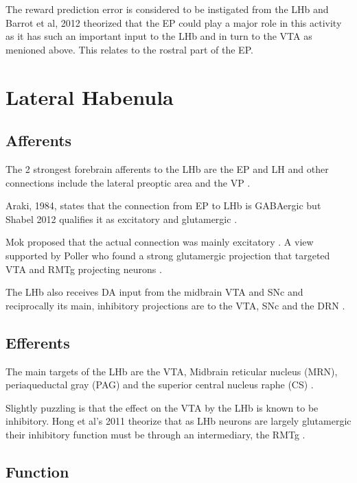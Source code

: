 \documentclass[12pt,a4paper]{article}
\let\oldsection\section
\renewcommand\section{\clearpage\oldsection}
\begin{document}
The reward prediction error is considered to be instigated from the LHb and Barrot et al, 2012 theorized that the EP could play a major role in this activity as it has such an important input to the LHb \citep{Barrot2012} and in turn to the VTA as menioned above. This relates to the rostral part of the EP.







\section{Lateral Habenula}

\subsection{Afferents}

The 2 strongest forebrain afferents to the LHb are the EP and LH and other connections include the lateral preoptic area and the VP \citep{Parent1981}. 

Araki, 1984, states that the connection from EP to LHb is GABAergic \citep{Araki1984} but Shabel 2012 qualifies it as excitatory and glutamergic \citep{Shabel2012}.

Mok proposed that the actual connection was mainly excitatory \citep{Mok1974}. A view supported by Poller who found a strong glutamergic projection that targeted VTA and RMTg projecting neurons \citep{Poller2013}.

The LHb also receives DA input from the midbrain VTA and SNc \citep{Kowski2009} and reciprocally its main, inhibitory projections are to the VTA, SNc and the DRN \citep{Ji2007}\citep{Christoph1986}\citep{Rajakumar1993}.

\subsection{Efferents}

The main targets of the LHb are the VTA, Midbrain reticular nucleus (MRN), periaqueductal gray (PAG) and the superior central nucleus raphe (CS) \citep{Quina2015}.

Slightly puzzling is that the effect on the VTA by the LHb is known to be inhibitory. Hong et al’s 2011 theorize that as LHb neurons are largely glutamergic their inhibitory function must be through an intermediary, the RMTg \citep{Hong2011}.

\subsection{Function}
\end{document}
